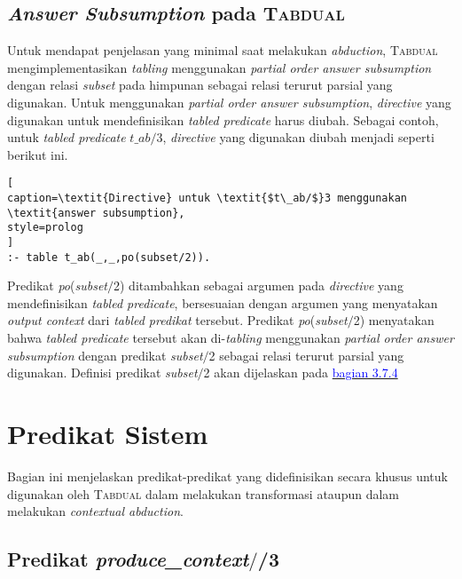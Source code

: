 \subsection{\textit{Answer Subsumption} pada \textsc{Tabdual}}
Untuk mendapat penjelasan yang minimal saat melakukan \textit{abduction}, \textsc{Tabdual} mengimplementasikan \textit{tabling} menggunakan \textit{partial order answer subsumption} dengan relasi \textit{subset} pada himpunan sebagai relasi terurut parsial yang digunakan. Untuk menggunakan \textit{partial order answer subsumption}, \textit{directive} yang digunakan untuk mendefinisikan \textit{tabled predicate} harus diubah. Sebagai contoh, untuk \textit{tabled predicate} \textit{$t\_ab/$}3, \textit{directive} yang digunakan diubah menjadi seperti berikut ini.
\\

\begin{lstlisting}[
caption=\textit{Directive} untuk \textit{$t\_ab/$}3 menggunakan \textit{answer subsumption},
style=prolog
]
:- table t_ab(_,_,po(subset/2)).
\end{lstlisting}

Predikat \textit{po}(\textit{subset$/$}2) ditambahkan sebagai argumen pada \textit{directive} yang mendefinisikan \textit{tabled predicate}, bersesuaian dengan argumen yang menyatakan \textit{output context} dari \textit{tabled predikat} tersebut. Predikat \textit{po}(\textit{subset$/$}2) menyatakan bahwa \textit{tabled predicate} tersebut akan di-\textit{tabling} menggunakan \textit{partial order answer subsumption} dengan predikat \textit{subset$/$}2 sebagai relasi terurut parsial yang digunakan. Definisi predikat \textit{subset$/$}2 akan dijelaskan pada \hyperref[subset]{\textcolor{blue}{bagian 3.7.4}}

\section{Predikat Sistem}

Bagian ini menjelaskan predikat-predikat yang didefinisikan secara khusus untuk digunakan oleh \textsc{Tabdual} dalam melakukan transformasi ataupun dalam melakukan \textit{contextual abduction}.

\subsection{Predikat \textit{produce\_context$/$}/3}


